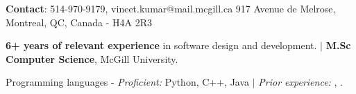\documentclass{resume} %
\begin{document}
\begin{hSubsection}{\textbf{Contact}: 514-970-9179, vineet.kumar@mail.mcgill.ca}
{%
}{917 Avenue de Melrose, Montreal, QC, Canada - H4A 2R3}
\end{hSubsection}



\smallskip \smallskip 
\begin{rSection}{} \smallskip \begin{lSubsection} 
\item \textbf{6+ years of relevant experience} in software design and
development. $\vert$ \textbf{M.Sc Computer Science}, McGill University. 
\item Programming languages - \emph{Proficient:} Python,
  C++, Java
$\vert$ \emph{Prior experience:} \xtenx, \matlabx.
\end{lSubsection}
\end{rSection}
\end{document}
